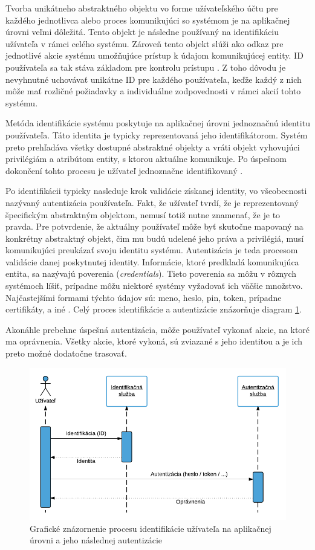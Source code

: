 \documentclass[
  printed, %
  table,   %
  lof,     %
  nolot,   %
  nocover
]{fithesis3}
\begin{document}
Tvorba unikátneho abstraktného objektu vo forme užívateľského účtu
pre každého jednotlivca alebo proces komunikujúci so systémom je na aplikačnej
úrovni veľmi dôležitá. Tento objekt je následne používaný na identifikáciu
užívateľa v rámci celého systému. Zároveň tento objekt slúži ako odkaz pre
jednotlivé akcie systému umožňujúce prístup k údajom komunikujúcej entity.
ID používateľa sa tak stáva základom pre kontrolu prístupu \cite{Todorov:2007:EX}. Z toho dôvodu je 
nevyhnutné uchovávať unikátne ID pre každého používateľa, keďže každý z nich
môže mať rozličné požiadavky a individuálne zodpovednosti v rámci akcií tohto
systému.

Metóda identifikácie systému poskytuje na aplikačnej úrovni jednoznačnú
identitu používateľa. Táto identita je typicky reprezentovaná jeho
identifikátorom. Systém preto prehľadáva všetky dostupné abstraktné objekty a
vráti objekt vyhovujúci privilégiám a atribútom entity, s ktorou aktuálne
komunikuje. Po úspešnom dokončení tohto procesu je užívateľ jednoznačne
identifikovaný \cite{Todorov:2007:EX}.

Po identifikácii typicky nasleduje krok validácie získanej identity,
vo všeobecnosti nazývaný autentizácia používateľa. Fakt, že užívateľ tvrdí,
že je reprezentovaný špecifickým abstraktným objektom, nemusí totiž nutne
znamenať, že je to pravda. Pre potvrdenie, že aktuálny používateľ môže byť
skutočne mapovaný na konkrétny abstraktný objekt, čim mu budú udelené jeho
práva a privilégiá, musí komunikujúci preukázať svoju identitu systému.
Autentizácia je teda procesom validácie danej poskytnutej identity. Informácie,
ktoré predkladá komunikujúca entita, sa nazývajú poverenia
(\textit{credentials}). Tieto poverenia sa môžu v rôznych systémoch líšiť, 
prípadne môžu niektoré systémy vyžadovať ich väčšie množstvo. Najčastejšími
formami týchto údajov sú: meno, heslo, pin, token, prípadne certifikáty, a iné \cite{Todorov:2007:EX}.
Celý proces identifikácie a autentizácie znázorňuje diagram \ref{fig:tech-app}.

Akonáhle prebehne úspešná autentizácia, môže používateľ vykonať akcie, na ktoré
ma oprávnenia. Všetky akcie, ktoré vykoná, sú zviazané s jeho identitou a je ich
preto možné dodatočne trasovať.

\begin{figure}[h]
  \centering
    \includegraphics[width=.94\textwidth]{images/tech-app.png}
  \caption{Grafické znázornenie procesu identifikácie užívateľa na aplikačnej
  úrovni a jeho následnej autentizácie}
  \label{fig:tech-app}
\end{figure}
\end{document}
